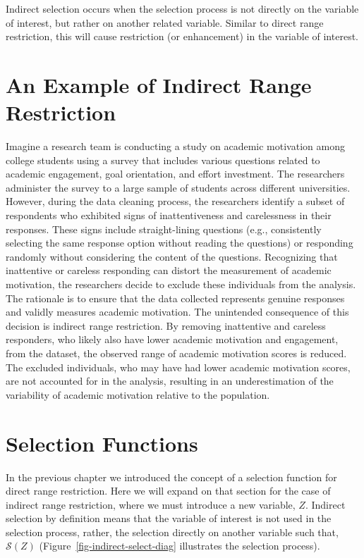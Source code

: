 \documentclass[
  letterpaper,
  DIV=11,
  numbers=noendperiod]{scrreprt}
\begin{document}
Indirect selection occurs when the selection process is not directly on
the variable of interest, but rather on another related variable.
Similar to direct range restriction, this will cause restriction (or
enhancement) in the variable of interest.

\hypertarget{an-example-of-indirect-range-restriction}{%
\section{An Example of Indirect Range
Restriction}\label{an-example-of-indirect-range-restriction}}

Imagine a research team is conducting a study on academic motivation
among college students using a survey that includes various questions
related to academic engagement, goal orientation, and effort investment.
The researchers administer the survey to a large sample of students
across different universities. However, during the data cleaning
process, the researchers identify a subset of respondents who exhibited
signs of inattentiveness and carelessness in their responses. These
signs include straight-lining questions (e.g., consistently selecting
the same response option without reading the questions) or responding
randomly without considering the content of the questions. Recognizing
that inattentive or careless responding can distort the measurement of
academic motivation, the researchers decide to exclude these individuals
from the analysis. The rationale is to ensure that the data collected
represents genuine responses and validly measures academic motivation.
The unintended consequence of this decision is indirect range
restriction. By removing inattentive and careless responders, who likely
also have lower academic motivation and engagement, from the dataset,
the observed range of academic motivation scores is reduced. The
excluded individuals, who may have had lower academic motivation scores,
are not accounted for in the analysis, resulting in an underestimation
of the variability of academic motivation relative to the population.

\hypertarget{selection-functions}{%
\section{Selection Functions}\label{selection-functions}}

In the previous chapter we introduced the concept of a selection
function for direct range restriction. Here we will expand on that
section for the case of indirect range restriction, where we must
introduce a new variable, \(Z\). Indirect selection by definition means
that the variable of interest is not used in the selection process,
rather, the selection directly on another variable such that,
\(\mathcal{S}(Z)\) (Figure~\ref{fig-indirect-select-diag} illustrates
the selection process).
\end{document}
